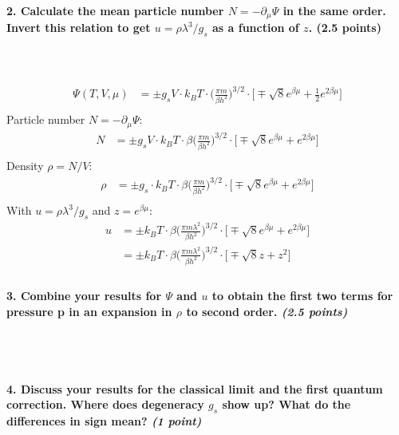 \paragraph{2. Calculate the mean particle number 
    $N =-\partial_\mu\Psi$ in the same order. Invert this 
    relation to get $u=\rho\lambda^3/g_s$ as a function of $z$. 
    (2.5 points)
} \ \\
    \\
    \begin{align}
        \Psi(T,V,\mu)
        &=\pm g_sV\cdot k_BT\cdot\bigg(
            \frac{\pi m}{\beta h^2}
        \bigg)^{3/2}\cdot\bigg[
            \mp\sqrt{8}e^{\beta\mu}
            +\frac{1}{2}e^{2\beta\mu}
        \bigg] \\
    \end{align}
    Particle number $N=-\partial_\mu\Psi$:
    \begin{align}
        N
        &=\pm g_sV\cdot k_BT\cdot\beta\bigg(
            \frac{\pi m}{\beta h^2}
        \bigg)^{3/2}\cdot\bigg[
            \mp\sqrt{8}e^{\beta\mu}
            +e^{2\beta\mu}
        \bigg] \\
    \end{align}
    Density $\rho=N/V$:
    \begin{align}
        \rho&=\pm g_s\cdot k_BT\cdot\beta\bigg(
            \frac{\pi m}{\beta h^2}
        \bigg)^{3/2}\cdot\bigg[
            \mp\sqrt{8}e^{\beta\mu}
            +e^{2\beta\mu}
        \bigg] \\
    \end{align}
    With $u=\rho\lambda^3/g_s$ and $z=e^{\beta\mu}$:
    \begin{align}
        u
        &=\pm k_BT\cdot\beta\bigg(
            \frac{\pi m\lambda^2}{\beta h^2}
        \bigg)^{3/2}\cdot\bigg[
            \mp\sqrt{8}e^{\beta\mu}
            +e^{2\beta\mu}
        \bigg] \\
        &=\pm k_BT\cdot\beta\bigg(
            \frac{\pi m\lambda^2}{\beta h^2}
        \bigg)^{3/2}\cdot\bigg[
            \mp\sqrt{8}z
            +z^2
        \bigg] \\
    \end{align}

\paragraph{3. Combine your results for $\Psi$ and $u$ to obtain 
    the first two terms for pressure p in an expansion in 
    $\rho$ to second order. \textit{(2.5 points)}
} \ \\
    \\

\paragraph{4. Discuss your results for the classical limit and 
    the first quantum correction. Where does degeneracy $g_s$
    show up? What do the differences in sign mean?
    \textit{(1 point)}
} \ \\
    \\
